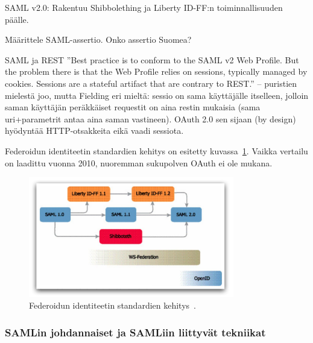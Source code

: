 \documentclass[finnish,gradu]{tktltiki}
\begin{document}


  SAML v2.0: Rakentuu Shibbolething ja Liberty ID-FF:n toiminnallisuuden päälle.

  Määrittele SAML-assertio. Onko assertio Suomea?

  SAML ja REST %
  ''Best practice is to conform to the SAML v2 Web Profile. But the problem there is that the Web Profile relies on sessions, typically managed by cookies. Sessions are a stateful artifact that are contrary to REST.'' -- puristien mielestä joo, mutta Fielding eri mieltä: sessio on sama käyttäjälle itselleen, jolloin saman käyttäjän peräkkäiset requestit on aina restin mukaisia (sama uri+parametrit antaa aina saman vastineen).
  OAuth 2.0 sen sijaan (by design) hyödyntää HTTP-otsakkeita eikä vaadi sessiota.

  Federoidun identiteetin standardien kehitys on esitetty kuvassa~\ref{fig:federoidun_id_standardien_kehitys}. Vaikka vertailu on laadittu vuonna 2010, nuoremman sukupolven OAuth ei ole mukana.

  \begin{figure}
    \centering
    \includegraphics[width=0.8\textwidth]{images/federoidun_id_standardien_kehitys.jpg}
    \caption{Federoidun identiteetin standardien kehitys~\cite{ping_identity_primer_federated_id_2010}.}
    \label{fig:federoidun_id_standardien_kehitys}
  \end{figure}


  \subsubsection{SAMLin johdannaiset ja SAMLiin liittyvät tekniikat} %
  \label{ssub:samlin_johdannaiset}
\end{document}

